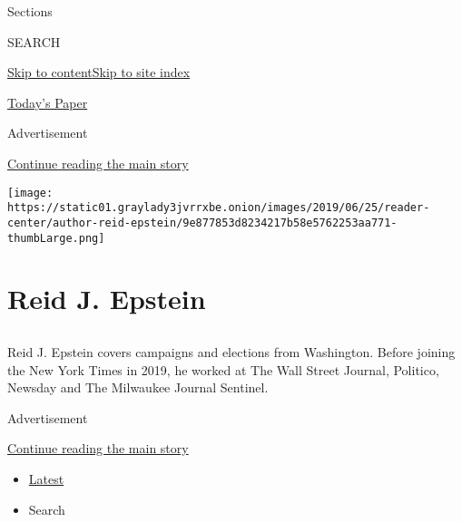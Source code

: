 Sections

SEARCH

\protect\hyperlink{site-content}{Skip to
content}\protect\hyperlink{site-index}{Skip to site index}

\href{https://myaccount.nytimes3xbfgragh.onion/auth/login?response_type=cookie\&client_id=vi}{}

\href{https://www.nytimes3xbfgragh.onion/section/todayspaper}{Today's
Paper}

Advertisement

\protect\hyperlink{after-top}{Continue reading the main story}

\texttt{[image: https://static01.graylady3jvrrxbe.onion/images/2019/06/25/reader-center/author-reid-epstein/9e877853d8234217b58e5762253aa771-thumbLarge.png]}

\hypertarget{reid-j-epstein}{%
\section{Reid J. Epstein}\label{reid-j-epstein}}

\subsection{}

Reid J. Epstein covers campaigns and elections from Washington. Before
joining the New York Times in 2019, he worked at The Wall Street
Journal, Politico, Newsday and The Milwaukee Journal Sentinel.

Advertisement

\protect\hyperlink{after-mid1}{Continue reading the main story}

\begin{itemize}
\tightlist
\item
  \protect\hyperlink{stream-panel}{Latest}
\item
  Search
\end{itemize}

